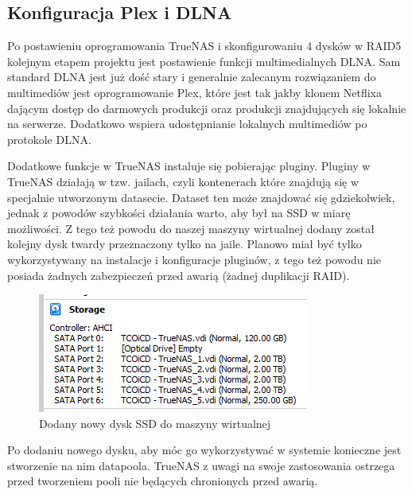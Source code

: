 \documentclass[12pt,a4paper]{article}
\newcommand{\<}{\langle}
\renewcommand{\>}{\rangle}
\theoremstyle{definition}
\begin{document}
\newpage
\subsection{Konfiguracja Plex i DLNA}

Po postawieniu oprogramowania TrueNAS i skonfigurowaniu 4 dysków w RAID5 kolejnym etapem projektu jest postawienie funkcji multimedialnych DLNA. Sam standard DLNA jest już dość stary i generalnie zalecanym rozwiązaniem do multimediów jest oprogramowanie Plex, które jest tak jakby klonem Netflixa dającym dostęp do darmowych produkcji oraz produkcji znajdujących się lokalnie na serwerze. Dodatkowo wspiera udostępnianie lokalnych multimediów po protokole DLNA.

Dodatkowe funkcje w TrueNAS instaluje się pobierając pluginy. Pluginy w TrueNAS działają w tzw. jailach, czyli kontenerach które znajdują się w specjalnie utworzonym datasecie. Dataset ten może znajdować się gdziekolwiek, jednak z powodów szybkości działania warto, aby był na SSD w miarę możliwości. Z tego też powodu do naszej maszyny wirtualnej dodany został kolejny dysk twardy przeznaczony tylko na jaile. Planowo miał być tylko wykorzystywany na instalacje i konfiguracje pluginów, z tego też powodu nie posiada żadnych zabezpieczeń przed awarią (żadnej duplikacji RAID).

\begin{figure}[H]
    \centering
    \includegraphics{img/ss_plex/1.png}
    \caption{Dodany nowy dysk SSD do maszyny wirtualnej}
\end{figure}

Po dodaniu nowego dysku, aby móc go wykorzystywać w systemie konieczne jest stworzenie na nim datapoola. TrueNAS z uwagi na swoje zastosowania ostrzega przed tworzeniem pooli nie będących chronionych przed awarią.
\end{document}
